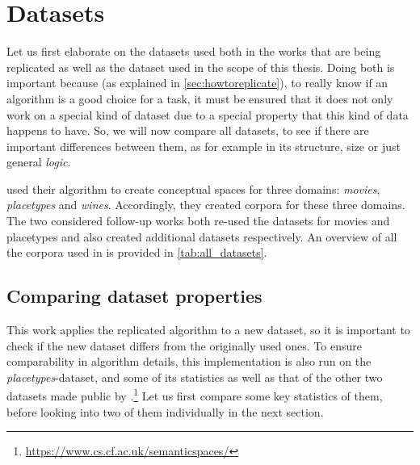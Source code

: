 \section{Datasets}

\label{sec:datasets}



Let us first elaborate on the datasets used both in the works that are being replicated as well as the dataset used in the scope of this thesis. Doing both is important because (as explained in \autoref{sec:howtoreplicate}), to really know if an algorithm is a good choice for a task, it must be ensured that it does not only work on a special kind of dataset due to a special property that this kind of data happens to have. So, we will now compare all datasets, to see if there are important differences between them, as for example in its structure, size or just general \emph{logic}.

\textcite{Derrac2015} used their algorithm to create conceptual spaces for three domains: \textit{movies}, \textit{placetypes} and \textit{wines}. Accordingly, they created corpora for these three domains. The two considered follow-up works both re-used the datasets for movies and placetypes and also created additional datasets respectively. An overview of all the corpora used in \mainalgos is provided in \autoref{tab:all_datasets}.


\subsection*{Comparing dataset properties}

This work applies the replicated algorithm to a new dataset, so it is important to check if the new dataset differs from the originally used ones. To ensure comparability in algorithm details, this implementation is also run on the \emph{placetypes}-dataset, and some of its statistics as well as that of the other two datasets made public by \cite{Derrac2015}.\footnote{\url{https://www.cs.cf.ac.uk/semanticspaces/}} Let us first compare some key statistics of them, before looking into two of them individually in the next section.

